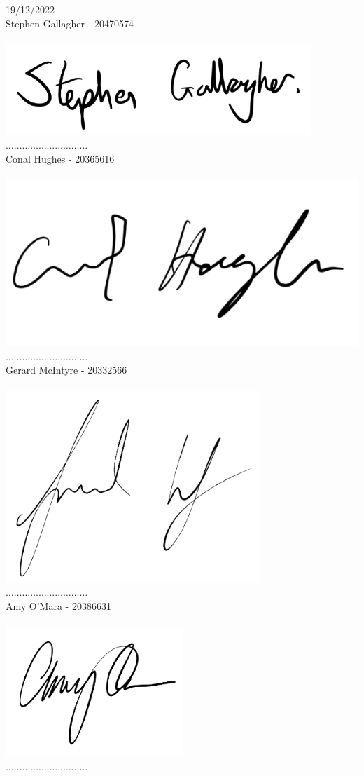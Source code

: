 \documentclass[12pt,a4paper]{article}
\begin{document}
	\begin{flushright}
		19/12/2022\\
		Stephen Gallagher - 20470574\\
		\ \\
		\includegraphics[width=0.2\linewidth]{Stephen}\\
		\vspace*{-1cm}
		$\ldots\ldots\ldots\ldots\ldots\ldots\ldots\ldots\ldots\ldots$
		\ \\
		Conal Hughes - 20365616\\
		\ \\	
		\vspace*{-0.5cm}
		\includegraphics[width=0.2\linewidth]{Conal}\\
		\vspace*{-1.2cm}
		$\ldots\ldots\ldots\ldots\ldots\ldots\ldots\ldots\ldots\ldots$
		\ \\
		Gerard McIntyre - 20332566\\
		\ \\	
		\vspace*{-0.5cm}
		\includegraphics[width=0.2\linewidth]{Gerard}\\
		\vspace*{-2cm}
		$\ldots\ldots\ldots\ldots\ldots\ldots\ldots\ldots\ldots\ldots$
		\ \\
		\vspace*{1cm}
		Amy O'Mara - 20386631\\
		\ \\
		\vspace*{-1cm}
		\includegraphics[width=0.2\linewidth]{Amy}\\
		\vspace*{-2cm}
		$\ldots\ldots\ldots\ldots\ldots\ldots\ldots\ldots\ldots\ldots$

\end{flushright}
\end{document}
